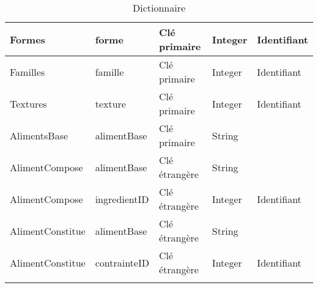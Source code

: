 \begin{longtable}{llp{5cm}ll}
  Formes & forme & Clé primaire & Integer & Identifiant \\ \hline
  Familles & famille & Clé primaire & Integer & Identifiant \\ \hline
  Textures & texture & Clé primaire & Integer & Identifiant \\ \hline
  AlimentsBase & alimentBase & Clé primaire & String &  \\ \hline
  AlimentCompose & alimentBase & Clé étrangère & String &  \\
  AlimentCompose & ingredientID & Clé étrangère & Integer & Identifiant \\ \hline
  AlimentConstitue & alimentBase & Clé étrangère & String &  \\
  AlimentConstitue & contrainteID & Clé étrangère & Integer & Identifiant \\ \hline
\caption{Dictionnaire}
\label{DictionnaireMDD}
\end{longtable}

